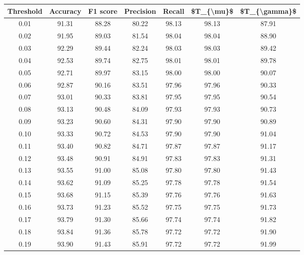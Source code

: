 \begin{tabular}{|c|c|c|c|c|c|c|}
\hline
 Threshold &  Accuracy &  F1 score &  Precision &  Recall &  \$T\_\{\textbackslash mu\}\$ &  \$T\_\{\textbackslash gamma\}\$ \\
\hline
      0.01 &     91.31 &     88.28 &      80.22 &   98.13 &      98.13 &         87.91 \\
      0.02 &     91.95 &     89.03 &      81.54 &   98.04 &      98.04 &         88.90 \\
      0.03 &     92.29 &     89.44 &      82.24 &   98.03 &      98.03 &         89.42 \\
      0.04 &     92.53 &     89.74 &      82.75 &   98.01 &      98.01 &         89.78 \\
      0.05 &     92.71 &     89.97 &      83.15 &   98.00 &      98.00 &         90.07 \\
      0.06 &     92.87 &     90.16 &      83.51 &   97.96 &      97.96 &         90.33 \\
      0.07 &     93.01 &     90.33 &      83.81 &   97.95 &      97.95 &         90.54 \\
      0.08 &     93.13 &     90.48 &      84.09 &   97.93 &      97.93 &         90.73 \\
      0.09 &     93.23 &     90.60 &      84.31 &   97.90 &      97.90 &         90.89 \\
      0.10 &     93.33 &     90.72 &      84.53 &   97.90 &      97.90 &         91.04 \\
      0.11 &     93.40 &     90.82 &      84.71 &   97.87 &      97.87 &         91.17 \\
      0.12 &     93.48 &     90.91 &      84.91 &   97.83 &      97.83 &         91.31 \\
      0.13 &     93.55 &     91.00 &      85.08 &   97.80 &      97.80 &         91.43 \\
      0.14 &     93.62 &     91.09 &      85.25 &   97.78 &      97.78 &         91.54 \\
      0.15 &     93.68 &     91.15 &      85.39 &   97.76 &      97.76 &         91.63 \\
      0.16 &     93.73 &     91.23 &      85.52 &   97.75 &      97.75 &         91.73 \\
      0.17 &     93.79 &     91.30 &      85.66 &   97.74 &      97.74 &         91.82 \\
      0.18 &     93.84 &     91.36 &      85.78 &   97.72 &      97.72 &         91.90 \\
      0.19 &     93.90 &     91.43 &      85.91 &   97.72 &      97.72 &         91.99 \\

\end{tabular}
